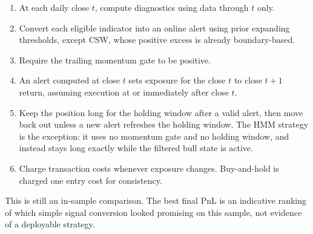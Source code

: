 \documentclass[11pt]{article}
\begin{document}
\begin{enumerate}
    \item At each daily close $t$, compute diagnostics using data through $t$ only.
    \item Convert each eligible indicator into an online alert using prior expanding thresholds, except CSW, whose positive excess is already boundary-based.
    \item Require the trailing momentum gate to be positive.
    \item An alert computed at close $t$ sets exposure for the close $t$ to close $t+1$ return, assuming execution at or immediately after close $t$.
    \item Keep the position long for the holding window after a valid alert, then move back out unless a new alert refreshes the holding window. The HMM strategy is the exception: it uses no momentum gate and no holding window, and instead stays long exactly while the filtered bull state is active.
    \item Charge transaction costs whenever exposure changes. Buy-and-hold is charged one entry cost for consistency.
\end{enumerate}

This is still an in-sample comparison. The best final PnL is an indicative ranking of which simple signal conversion looked promising on this sample, not evidence of a deployable strategy.

\begin{table}[H]
\centering
\scriptsize
\setlength{\tabcolsep}{4pt}
\caption{Best long/flat structure-break strategy by final equity multiple. Best structure signal excludes buy-and-hold; best including buy-and-hold includes it. Max DD, exposure, and trades refer to the best structure signal.}
\end{table}
\end{document}
